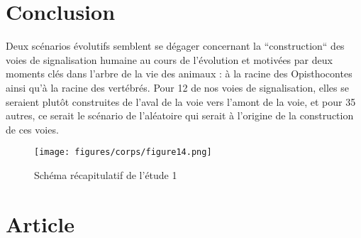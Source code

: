 \section{Conclusion}
\par Deux scénarios évolutifs semblent se dégager concernant la “construction“ des voies de signalisation humaine au cours de l’évolution et motivées par deux moments clés dans l’arbre de la vie des animaux : à la racine des Opisthocontes ainsi qu’à la racine des vertébrés. Pour 12 de nos voies de signalisation, elles se seraient plutôt construites de l’aval de la voie vers l’amont de la voie, et pour 35 autres, ce serait le scénario de l'aléatoire qui serait à l’origine de la construction de ces voies.

\begin{figure}[H]
    \centering
    \texttt{[image: figures/corps/figure14.png]}
    \caption{Schéma récapitulatif de l'étude 1}
    \label{fig:14_schéma1}
\end{figure}

\section{Article}\label{art1}



